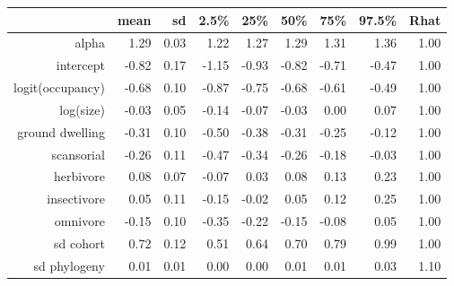 \begin{table}[ht]
\centering
\begin{tabular}{rrrrrrrrr}
  \hline
 & mean & sd & 2.5\% & 25\% & 50\% & 75\% & 97.5\% & Rhat \\ 
  \hline
alpha & 1.29 & 0.03 & 1.22 & 1.27 & 1.29 & 1.31 & 1.36 & 1.00 \\ 
  intercept & -0.82 & 0.17 & -1.15 & -0.93 & -0.82 & -0.71 & -0.47 & 1.00 \\ 
  logit(occupancy) & -0.68 & 0.10 & -0.87 & -0.75 & -0.68 & -0.61 & -0.49 & 1.00 \\ 
  log(size) & -0.03 & 0.05 & -0.14 & -0.07 & -0.03 & 0.00 & 0.07 & 1.00 \\ 
  ground dwelling & -0.31 & 0.10 & -0.50 & -0.38 & -0.31 & -0.25 & -0.12 & 1.00 \\ 
  scansorial & -0.26 & 0.11 & -0.47 & -0.34 & -0.26 & -0.18 & -0.03 & 1.00 \\ 
  herbivore & 0.08 & 0.07 & -0.07 & 0.03 & 0.08 & 0.13 & 0.23 & 1.00 \\ 
  insectivore & 0.05 & 0.11 & -0.15 & -0.02 & 0.05 & 0.12 & 0.25 & 1.00 \\ 
  omnivore & -0.15 & 0.10 & -0.35 & -0.22 & -0.15 & -0.08 & 0.05 & 1.00 \\ 
  sd cohort & 0.72 & 0.12 & 0.51 & 0.64 & 0.70 & 0.79 & 0.99 & 1.00 \\ 
  sd phylogeny & 0.01 & 0.01 & 0.00 & 0.00 & 0.01 & 0.01 & 0.03 & 1.10 \\ 
   \hline
\end{tabular}
\label{post_sum}
\end{table}
